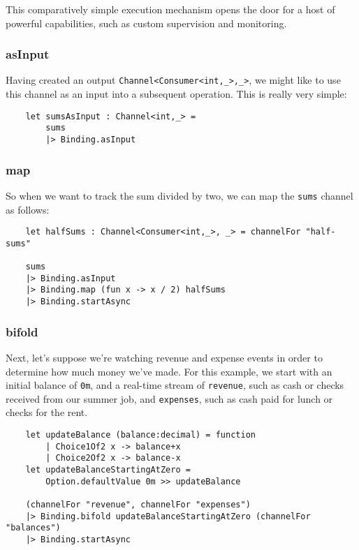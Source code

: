 \documentclass{article}
\begin{document}
This comparatively simple execution mechanism opens the door for a host of powerful capabilities, such as custom supervision and monitoring.

\subsubsection{asInput}

Having created an output \texttt{Channel<Consumer<int,_>,_>}, we might like to use this channel as an input into a subsequent operation.  This is really very simple:

\begin{verbatim}
    let sumsAsInput : Channel<int,_> =
        sums
        |> Binding.asInput
\end{verbatim}

\subsubsection{map}

So when we want to track the sum divided by two, we can map the \texttt{sums} channel as follows:

\begin{verbatim}
    let halfSums : Channel<Consumer<int,_>, _> = channelFor "half-sums"

    sums
    |> Binding.asInput
    |> Binding.map (fun x -> x / 2) halfSums
    |> Binding.startAsync
\end{verbatim}

\subsubsection{bifold}

Next, let's suppose we're watching revenue and expense events in order to determine how much money we've made.  For this example, we start with an initial balance of \texttt{0m}, and a real-time stream of \texttt{revenue}, such as cash or checks received from our summer job, and \texttt{expenses}, such as cash paid for lunch or checks for the rent.

\begin{verbatim}
    let updateBalance (balance:decimal) = function
        | Choice1Of2 x -> balance+x
        | Choice2Of2 x -> balance-x
    let updateBalanceStartingAtZero =
        Option.defaultValue 0m >> updateBalance

    (channelFor "revenue", channelFor "expenses")
    |> Binding.bifold updateBalanceStartingAtZero (channelFor "balances")
    |> Binding.startAsync
\end{verbatim}
\end{document}
